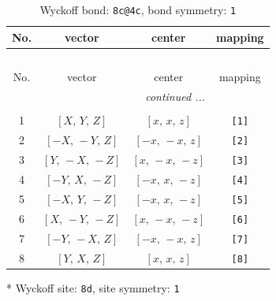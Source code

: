 \documentclass[fleqn,8pt]{jsarticle}
\begin{document}
\renewcommand{\arraystretch}{1.2}
\begin{longtable}{cccc}
\caption{Wyckoff bond: {\tt 8c@4c}, bond symmetry: {\tt 1}}
 \\
 \hline \hline
No. & vector & center & mapping \\ \hline \endfirsthead

\multicolumn{3}{l}{\tablename\ \thetable{}} \\
 \hline \hline
No. & vector & center & mapping \\ \hline \endhead

 \hline \hline
\multicolumn{3}{r}{\footnotesize\it continued ...} \\ \endfoot

 \hline \hline
\multicolumn{3}{r}{} \\ \endlastfoot

1 & $\left[ X,\, Y,\, Z \right]$ & $\left[ x,\, x,\, z \right]$ & {\tt [1]} \\ \hline
2 & $\left[ - X,\, - Y,\, Z \right]$ & $\left[ - x,\, - x,\, z \right]$ & {\tt [2]} \\ \hline
3 & $\left[ Y,\, - X,\, - Z \right]$ & $\left[ x,\, - x,\, - z \right]$ & {\tt [3]} \\ \hline
4 & $\left[ - Y,\, X,\, - Z \right]$ & $\left[ - x,\, x,\, - z \right]$ & {\tt [4]} \\ \hline
5 & $\left[ - X,\, Y,\, - Z \right]$ & $\left[ - x,\, x,\, - z \right]$ & {\tt [5]} \\ \hline
6 & $\left[ X,\, - Y,\, - Z \right]$ & $\left[ x,\, - x,\, - z \right]$ & {\tt [6]} \\ \hline
7 & $\left[ - Y,\, - X,\, Z \right]$ & $\left[ - x,\, - x,\, z \right]$ & {\tt [7]} \\ \hline
8 & $\left[ Y,\, X,\, Z \right]$ & $\left[ x,\, x,\, z \right]$ & {\tt [8]} \\
\end{longtable}
* Wyckoff site: {\tt 8d}, site symmetry: {\tt 1}
\renewcommand{\arraystretch}{1.2}
\end{document}
